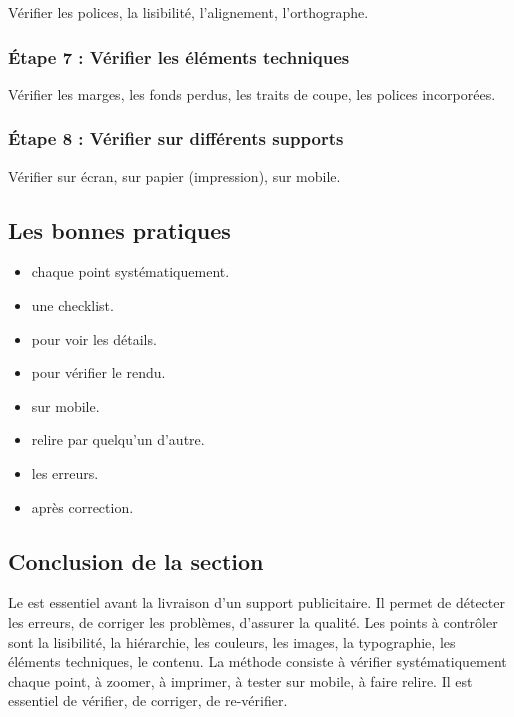 Vérifier les polices, la lisibilité, l'alignement, l'orthographe.

\subsubsection{Étape 7 : Vérifier les éléments techniques}

Vérifier les marges, les fonds perdus, les traits de coupe, les polices incorporées.

\subsubsection{Étape 8 : Vérifier sur différents supports}

Vérifier sur écran, sur papier (impression), sur mobile.

\subsection{Les bonnes pratiques}

\begin{itemize}
    \item {} chaque point systématiquement.
    \item {} une checklist.
    \item {} pour voir les détails.
    \item {} pour vérifier le rendu.
    \item {} sur mobile.
    \item {} relire par quelqu'un d'autre.
    \item {} les erreurs.
    \item {} après correction.
\end{itemize}

\subsection*{Conclusion de la section}

Le  est essentiel avant la livraison d'un support publicitaire. Il permet de détecter les erreurs, de corriger les problèmes, d'assurer la qualité. Les points à contrôler sont la lisibilité, la hiérarchie, les couleurs, les images, la typographie, les éléments techniques, le contenu. La méthode consiste à vérifier systématiquement chaque point, à zoomer, à imprimer, à tester sur mobile, à faire relire. Il est essentiel de vérifier, de corriger, de re-vérifier.

